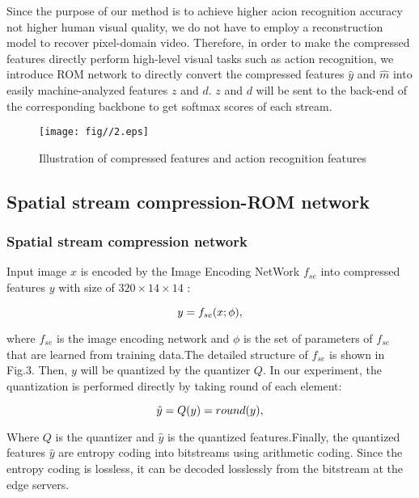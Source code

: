 \documentclass[a4paper]{cas-sc}
\begin{document}
Since the purpose of our method is to achieve higher acion recognition accuracy not
higher human visual quality, we do not have to employ a reconstruction model to recover pixel-domain video. 
Therefore, in order to make the compressed features directly perform high-level visual tasks such as action recognition, 
we introduce ROM  network to directly 
convert the compressed features $\hat{y}$ and $\hat{m}$ into easily machine-analyzed features $z$ and $d$. 
 $z$ and $d$ will be sent to the back-end of the corresponding backbone to get softmax scores of each stream.\\

 \begin{figure}[ht]
	\centering
		\texttt{[image: fig//2.eps]}
	  \caption{Illustration of compressed features and action recognition features}\label{fig.2}
\end{figure}

\subsection{Spatial stream compression-ROM network}
\subsubsection{Spatial stream compression network}
Input image $x$ is encoded by the Image Encoding NetWork $f_{se}$ into compressed features $y$ with size of  $320\times14\times14$ :

\begin{equation}
  \centering
    y=f_{se}(x;\phi),
\end{equation}

where $f_{se}$ is the image encoding network and $\phi$ is the set of parameters of $f_{se}$ 
that are learned from training data.The detailed structure of $f_{se}$ is shown in Fig.3.
Then, $y$ will be quantized by the quantizer $Q$. In our experiment, the quantization is performed directly by taking round of each element:

\begin{equation}
  \centering
    \hat{y}=Q(y)=round(y),
\end{equation}

Where $Q$ is the quantizer and $\hat{y}$ is the quantized features.Finally, 
the quantized features $\hat{y}$  are entropy coding into bitstreams using arithmetic coding.
Since the entropy coding is lossless, it can be decoded losslessly from the bitstream at the edge servers.
\end{document}
